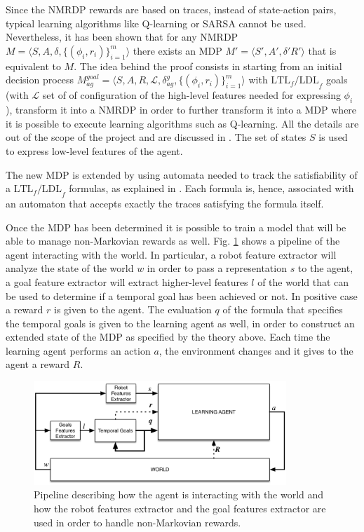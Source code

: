 Since the NMRDP rewards are based on traces, instead of state-action pairs,
typical learning algorithms like Q-learning or SARSA cannot be used.
Nevertheless, it has been shown \cite{DBLP:journals/corr/abs-1807-06333} that
for any NMRDP $M = \langle S, A, \delta, \{ (\phi_i, r_i) \}_{i=1}^m \rangle$
there exists an MDP $M' = \langle S', A', \delta' R' \rangle$ that is equivalent
to $M$. The idea behind the proof consists in starting from an initial
decision process $M_{ag}^{goal} = \langle S, A, R, \mathcal{L},
\delta_{ag}^g, \{ (\phi_i, r_i) \}_{i=1}^m \rangle$ with
$\text{LTL}_f\text{/LDL}_f$ goals (with $\mathcal{L}$ set of of configuration
of the high-level features needed for expressing $\phi_i$),
transform it into a NMRDP in order to
further transform it into a MDP where it is possible to execute learning
algorithms such as Q-learning. All the details are out of the scope of the
project and are discussed in \cite{DBLP:journals/corr/abs-1807-06333}. The
set of states $S$ is used to express low-level features of the agent.

The new MDP is extended by using automata needed to track the satisfiability
of a $\text{LTL}_f\text{/LDL}_f$ formulas, as explained in
\cite{DBLP:conf/aaai/2018}. Each formula is, hence, associated with an
automaton that accepts exactly the traces satisfying the formula itself.

Once the MDP has been determined it is possible to train a model that will
be able to manage non-Markovian rewards as well. Fig.
\ref{fig:rl-temporalgoals-pipeline} shows a pipeline of the
agent interacting with the world. In particular, a robot feature extractor
will analyze the state of the world $w$ in order to pass a representation $s$ to the
agent, a goal feature extractor will extract higher-level features $l$ of the world
that can be used to determine if a temporal goal has been achieved or not. In
positive case a reward $r$ is given to the agent. The evaluation $q$ of the formula
that specifies the temporal goals is given to the learning agent as well, in
order to construct an extended state of the MDP as specified by the theory above.
Each time the learning agent performs an action $a$, the environment changes
and it gives to the agent a reward $R$.
\begin{figure}
    \centering
    \includegraphics[width=0.85\textwidth]{images/rl-temporalgoals-pipeline.png}
    \caption{Pipeline describing how the agent is interacting with the
        world and how the robot features extractor and the goal features
        extractor are used in order to handle non-Markovian rewards.}
    \label{fig:rl-temporalgoals-pipeline}
\end{figure}

